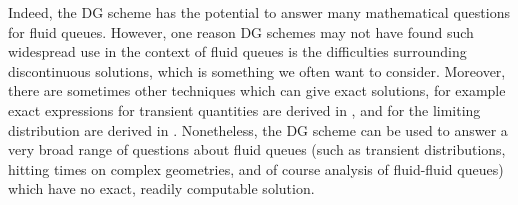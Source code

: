 Indeed, the DG scheme has the potential to answer many mathematical questions for fluid queues. However, one reason DG schemes may not have found such widespread use in the context of fluid queues is the difficulties surrounding discontinuous solutions, which is something we often want to consider. Moreover, there are sometimes other techniques which can give exact solutions, for example exact expressions for transient quantities are derived in \cite{rs2003,ar2004,bean2005,bean2009}, and for the limiting distribution are derived in \cite{ajr2005,dasilva2005,lnp13,s2017}. Nonetheless, the DG scheme can be used to answer a very broad range of questions about fluid queues (such as transient distributions, hitting times on complex geometries, and of course analysis of fluid-fluid queues) which have no exact, readily computable solution.%


